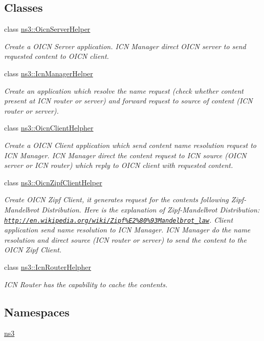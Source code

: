 \subsection*{Classes}
\begin{DoxyCompactItemize}
\item 
class \hyperlink{classns3_1_1OicnServerHelper}{ns3\-::\-Oicn\-Server\-Helper}
\begin{DoxyCompactList}\small\item\em Create a O\-I\-C\-N Server application. I\-C\-N Manager direct O\-I\-C\-N server to send requested content to O\-I\-C\-N client. \end{DoxyCompactList}\item 
class \hyperlink{classns3_1_1IcnManagerHelper}{ns3\-::\-Icn\-Manager\-Helper}
\begin{DoxyCompactList}\small\item\em Create an application which resolve the name request (check whether content present at I\-C\-N router or server) and forward request to source of content (I\-C\-N router or server). \end{DoxyCompactList}\item 
class \hyperlink{classns3_1_1OicnClientHelpher}{ns3\-::\-Oicn\-Client\-Helpher}
\begin{DoxyCompactList}\small\item\em Create a O\-I\-C\-N Client application which send content name resolution request to I\-C\-N Manager. I\-C\-N Manager direct the content request to I\-C\-N source (O\-I\-C\-N server or I\-C\-N router) which reply to O\-I\-C\-N client with requested content. \end{DoxyCompactList}\item 
class \hyperlink{classns3_1_1OicnZipfClientHelper}{ns3\-::\-Oicn\-Zipf\-Client\-Helper}
\begin{DoxyCompactList}\small\item\em Create O\-I\-C\-N Zipf Client, it generates request for the contents following Zipf-\/\-Mandelbrot Distribution. Here is the explanation of Zipf-\/\-Mandelbrot Distribution\-: \href{http://en.wikipedia.org/wiki/Zipf%E2%80%93Mandelbrot_law}{\tt http\-://en.\-wikipedia.\-org/wiki/\-Zipf\%\-E2\%80\%93\-Mandelbrot\-\_\-law}. Client application send name resolution to I\-C\-N Manager. I\-C\-N Manager do the name resolution and direct source (I\-C\-N router or server) to send the content to the O\-I\-C\-N Zipf Client. \end{DoxyCompactList}\item 
class \hyperlink{classns3_1_1IcnRouterHelpher}{ns3\-::\-Icn\-Router\-Helpher}
\begin{DoxyCompactList}\small\item\em I\-C\-N Router has the capability to cache the contents. \end{DoxyCompactList}\end{DoxyCompactItemize}
\subsection*{Namespaces}
\begin{DoxyCompactItemize}
\item 
\hyperlink{namespacens3}{ns3}
\end{DoxyCompactItemize}
